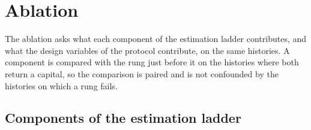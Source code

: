\section{Ablation}
\label{sec:ablation}

The ablation asks what each component of the estimation ladder contributes, and what the design variables of the protocol contribute, on the same histories. A component is compared with the rung just before it on the histories where both return a capital, so the comparison is paired and is not confounded by the histories on which a rung fails.

\subsection{Components of the estimation ladder}
\label{sec:abl-components}

